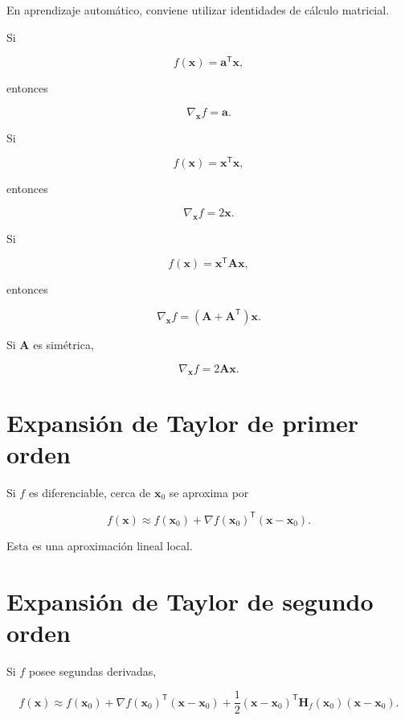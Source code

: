 \documentclass[
  spanish,
  10.5pt,
  letterpaper,
  DIV=11,
  numbers=noendperiod,
  oneside,
  open=any]{scrreprt}
\theoremstyle{definition}
\theoremstyle{definition}
\theoremstyle{plain}
\theoremstyle{remark}
\begin{document}

En aprendizaje automático, conviene utilizar identidades de cálculo
matricial.

Si

\[
f(\mathbf{x})
=
\mathbf{a}^{\mathsf T}\mathbf{x},
\]

entonces

\[
\nabla_{\mathbf{x}}f
=
\mathbf{a}.
\]

Si

\[
f(\mathbf{x})
=
\mathbf{x}^{\mathsf T}\mathbf{x},
\]

entonces

\[
\nabla_{\mathbf{x}}f
=
2\mathbf{x}.
\]

Si

\[
f(\mathbf{x})
=
\mathbf{x}^{\mathsf T}
\mathbf{A}
\mathbf{x},
\]

entonces

\[
\nabla_{\mathbf{x}}f
=
(\mathbf{A}+\mathbf{A}^{\mathsf T})\mathbf{x}.
\]

Si \(\mathbf{A}\) es simétrica,

\[
\nabla_{\mathbf{x}}f
=
2\mathbf{A}\mathbf{x}.
\]

\section*{Expansión de Taylor de primer
orden}\label{expansiuxf3n-de-taylor-de-primer-orden}


Si \(f\) es diferenciable, cerca de \(\mathbf{x}_0\) se aproxima por

\[
f(\mathbf{x})
\approx
f(\mathbf{x}_0)
+
\nabla f(\mathbf{x}_0)^{\mathsf T}
(\mathbf{x}-\mathbf{x}_0).
\]

Esta es una aproximación lineal local.

\section*{Expansión de Taylor de segundo
orden}\label{expansiuxf3n-de-taylor-de-segundo-orden}


Si \(f\) posee segundas derivadas,

\[
f(\mathbf{x})
\approx
f(\mathbf{x}_0)
+
\nabla f(\mathbf{x}_0)^{\mathsf T}
(\mathbf{x}-\mathbf{x}_0)
+
\frac{1}{2}
(\mathbf{x}-\mathbf{x}_0)^{\mathsf T}
\mathbf{H}_f(\mathbf{x}_0)
(\mathbf{x}-\mathbf{x}_0).
\]
\end{document}

